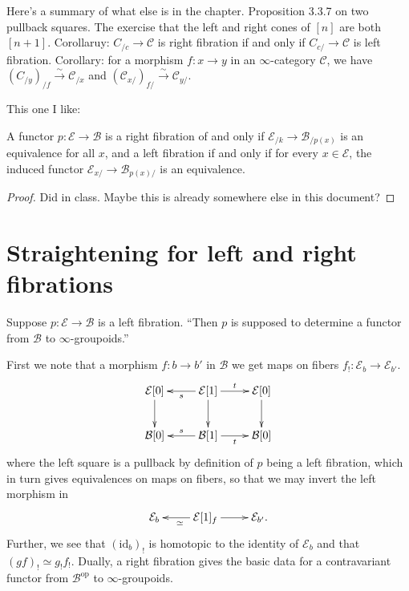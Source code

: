 \medskip\noindent
Here's a summary of what else is in the chapter.
Proposition 3.3.7 on two pullback squares.
The exercise that the left and right cones of $[n]$ are both $[n+1]$.
Corollaruy: $C_{/c}\to \mathcal{C}$ is right fibration
if and only if $C_{c/}\to \mathcal{C}$ is left fibration.
Corollary: for a morphism  $f:x \to y$ in an $\infty$-category $\mathcal{C}$,
we have $(C_{/y})_{/f}\xrightarrow{\sim}\mathcal{C}_{/x}$
and $(\mathcal{C}_{x/})_{f/}\xrightarrow{\sim}\mathcal{C}_{y/}$.

\medskip\noindent
This one I like:

\begin{lemma}
\label{lemma-left-fibration-iff-induced}
A functor $p:\mathcal{E} \to \mathcal{B}$ is a
right fibration of and only if
$\mathcal{E}_{/k}\to\mathcal{B}_{/p(x)}$
is an equivalence for all $x$, and a
left fibration
if and only if for every $x \in \mathcal{E}$,
the induced functor $\mathcal{E}_{x/}\to \mathcal{B}_{p(x)/}$ 
is an equivalence.
\end{lemma}

\begin{proof}
Did in class. Maybe this is already somewhere else in this document?
\end{proof}






\section{Straightening for left and right fibrations}
\label{section-straightening}

\noindent
Suppose $p:\mathcal{E} \to \mathcal{B}$ is a left fibration.
``Then $p$ is supposed to determine a functor
from $\mathcal{B}\text{}$ to $\infty$-groupoids.''

First we note that a morphism $f:b \to b'$ in $\mathcal{B}$
we get maps on fibers $f_!:\mathcal{E}_b \to \mathcal{E}_{b'}$.
$$
\xymatrix{
\mathcal{E}[0]\ar[d]&\mathcal{E}[1]\ar[l]^s\ar[d]\ar[r]^t&
\mathcal{E}[0]\ar[d]\\
\mathcal{B}[0]&\mathcal{B}[1]\ar[l]_s\ar[r]_t&\mathcal{B}[0]
}
$$
where the left square is a pullback by definition of
$p$ being a left fibration, which in turn gives
equivalences on maps on fibers, so that we may invert the
left morphism in
$$
\xymatrix{
\mathcal{E}_b & \mathcal{E}[1]_f\ar[l]^\simeq \ar[r]& \mathcal{E}_{b'}.
}
$$
Further, we see that $(\text{id}_b)_!$ is 
homotopic to the identity of $\mathcal{E}_b$
and that $(gf)_! \simeq g_!f_!$.
Dually, a right fibration gives the
basic data for a contravariant functor from
$\mathcal{B}^{\text{op}}$ to $\infty$-groupoids.


